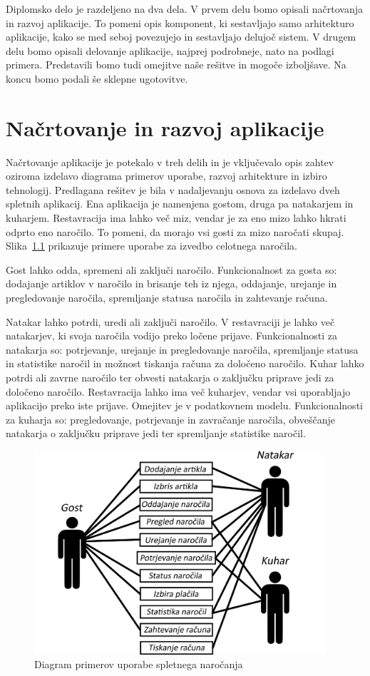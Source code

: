 \documentclass[a4paper, 12pt]{book}
\begin{document}
Diplomsko delo je razdeljeno na dva dela. V prvem delu bomo opisali načrtovanja in razvoj aplikacije. To pomeni opis komponent, ki sestavljajo samo arhitekturo aplikacije, kako se med seboj povezujejo in sestavljajo delujoč sistem. V drugem delu bomo opisali delovanje aplikacije, najprej podrobneje, nato na podlagi primera. Predstavili bomo tudi omejitve naše rešitve in mogoče izboljšave. Na koncu bomo podali še sklepne ugotovitve. 

\chapter{Načrtovanje in razvoj aplikacije}

Načrtovanje aplikacije je potekalo v treh delih in je vključevalo opis zahtev oziroma izdelavo diagrama primerov uporabe, razvoj arhitekture in izbiro tehnologij. Predlagana rešitev je bila v nadaljevanju osnova za izdelavo dveh spletnih aplikacij. Ena aplikacija je namenjena gostom, druga pa natakarjem in kuharjem. Restavracija ima lahko več miz, vendar je za eno mizo lahko hkrati odprto eno naročilo. To pomeni, da morajo vsi gosti za mizo naročati skupaj. Slika~\ref{FunkVloge} prikazuje primere uporabe za izvedbo celotnega naročila. 

Gost lahko odda, spremeni ali zaključi naročilo. Funkcionalnost za gosta so: dodajanje artiklov v naročilo in brisanje teh iz njega, oddajanje, urejanje in pregledovanje naročila, spremljanje statusa naročila in zahtevanje računa. 

Natakar lahko potrdi, uredi ali zaključi naročilo. V restavraciji je lahko več natakarjev, ki svoja naročila vodijo preko ločene prijave. Funkcionalnosti za natakarja so: potrjevanje, urejanje in pregledovanje naročila, spremljanje statusa in statistike naročil in možnost tiskanja računa za določeno naročilo. Kuhar lahko potrdi ali zavrne naročilo ter obvesti natakarja o zaključku priprave jedi za določeno naročilo. Restavracija lahko ima več kuharjev, vendar vsi uporabljajo aplikacijo preko iste prijave. Omejitev je v podatkovnem modelu. Funkcionalnosti za kuharja so: pregledovanje, potrjevanje in zavračanje naročila, obveščanje natakarja o zaključku priprave jedi ter spremljanje statistike naročil. 

\begin{figure}[!htb]
\centering
\includegraphics[width=10.8cm]{Skica2.png}
\caption{Diagram primerov uporabe spletnega naročanja}
\label{FunkVloge}
\end{figure}
\end{document}
